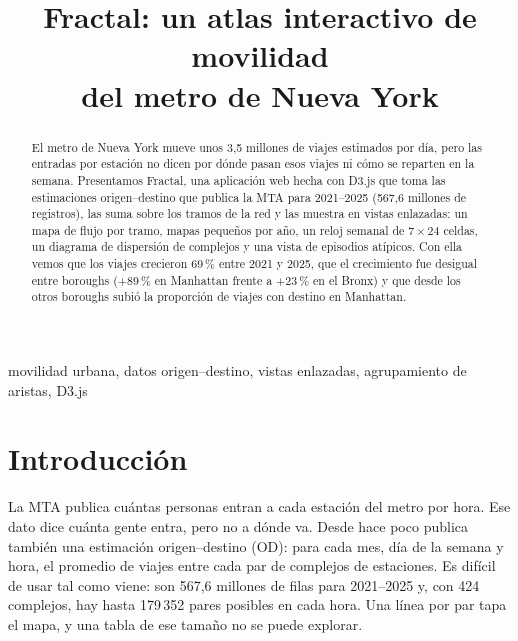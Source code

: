 \documentclass[conference,a4paper]{IEEEtran}
\begin{document}
\title{Fractal: un atlas interactivo de movilidad\\ del metro de Nueva York}

\author{
}

\maketitle
\setcounter{figure}{1}%

\begin{abstract}
El metro de Nueva York mueve unos 3,5 millones de viajes estimados por día, pero las entradas por estación no dicen por dónde pasan esos viajes ni cómo se reparten en la semana. Presentamos Fractal, una aplicación web hecha con D3.js que toma las estimaciones origen--destino que publica la MTA para 2021--2025 (567,6 millones de registros), las suma sobre los tramos de la red y las muestra en vistas enlazadas: un mapa de flujo por tramo, mapas pequeños por año, un reloj semanal de $7\times24$ celdas, un diagrama de dispersión de complejos y una vista de episodios atípicos. Con ella vemos que los viajes crecieron 69\,\% entre 2021 y 2025, que el crecimiento fue desigual entre boroughs (+89\,\% en Manhattan frente a +23\,\% en el Bronx) y que desde los otros boroughs subió la proporción de viajes con destino en Manhattan.
\end{abstract}

\begin{IEEEkeywords}
movilidad urbana, datos origen--destino, vistas enlazadas, agrupamiento de aristas, D3.js
\end{IEEEkeywords}

\section{Introducción}
La MTA publica cuántas personas entran a cada estación del metro por hora. Ese dato dice cuánta gente entra, pero no a dónde va. Desde hace poco publica también una estimación origen--destino (OD): para cada mes, día de la semana y hora, el promedio de viajes entre cada par de complejos de estaciones. Es difícil de usar tal como viene: son 567,6 millones de filas para 2021--2025 y, con 424 complejos, hay hasta 179\,352 pares posibles en cada hora. Una línea por par tapa el mapa, y una tabla de ese tamaño no se puede explorar.
\end{document}
